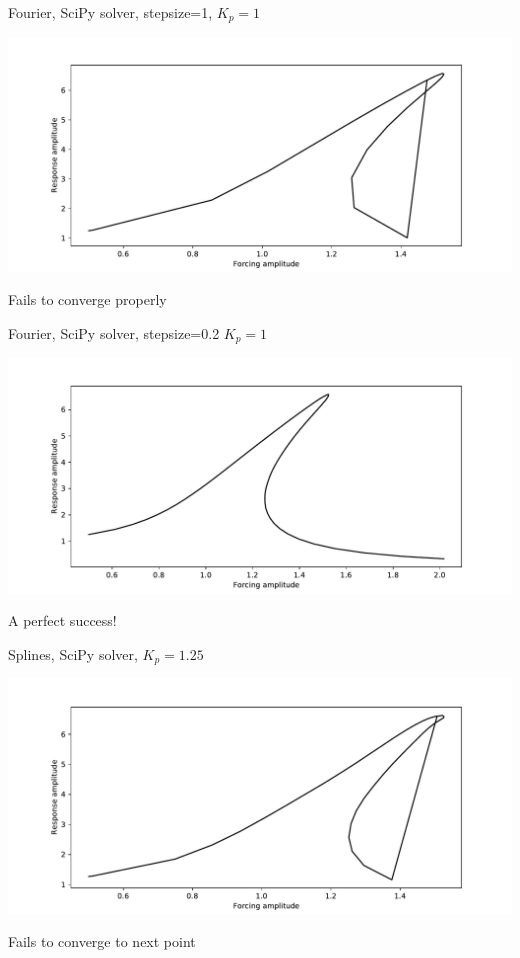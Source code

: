 \documentclass[presentation]{beamer}
\begin{document}
\begin{frame}[label={sec:org25fd48e}]{Fourier, SciPy solver, stepsize=1, \(K_p=1\)}
\begin{center}
\includegraphics[width=.9\linewidth]{./kp1_transtime100_scipy_fourier.pdf}
\end{center}

Fails to converge properly
\end{frame}

\begin{frame}[label={sec:orga0cbd60}]{Fourier, SciPy solver, stepsize=0.2 \(K_p=1\)}
\begin{center}
\includegraphics[width=.9\linewidth]{./kp1_transtime100_scipy_fourier_ss0d2.pdf}
\end{center}

A perfect success!
\end{frame}

\begin{frame}[label={sec:org1ddb797}]{Splines, SciPy solver, \(K_p=1.25\)}
\begin{center}
\includegraphics[width=.9\linewidth]{./kp1d25_transtime100_scipy.pdf}
\end{center}

Fails to converge to next point
\end{frame}
\end{document}

